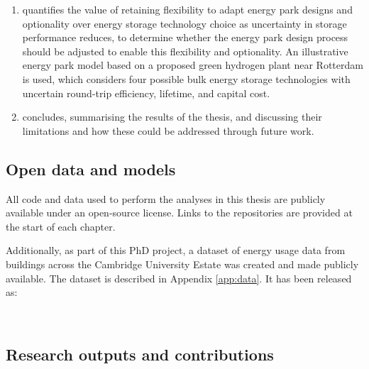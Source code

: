 \begin{enumerate}[wide, labelwidth=!, labelindent=0pt]
    \item[\it\Cref{chap:parks}] quantifies the value of retaining flexibility to adapt energy park designs and optionality over energy storage technology choice as uncertainty in storage performance reduces, to determine whether the energy park design process should be adjusted to enable this flexibility and optionality. An illustrative energy park model based on a proposed green hydrogen plant near Rotterdam is used, which considers four possible bulk energy storage technologies with uncertain round-trip efficiency, lifetime, and capital cost.

    \item[\it\Cref{chap:conclusion}] concludes, summarising the results of the thesis, and discussing their limitations and how these could be addressed through future work.

\end{enumerate}



\ifdefineSpeech
\else

\newpage
\subsection{Open data and models}

All code and data used to perform the analyses in this thesis are publicly available under an open-source license. Links to the repositories are provided at the start of each chapter.

Additionally, as part of this PhD project, a dataset of energy usage data from buildings across the Cambridge University Estate was created and made publicly available. The dataset is described in Appendix \ref{app:data}. It has been released as:

\begin{cbox}[colback=Cerulean!10!white]{}
    \setlength{\parindent}{0pt}%


\end{cbox}

\hfill \\

\subsection{Research outputs and contributions}

